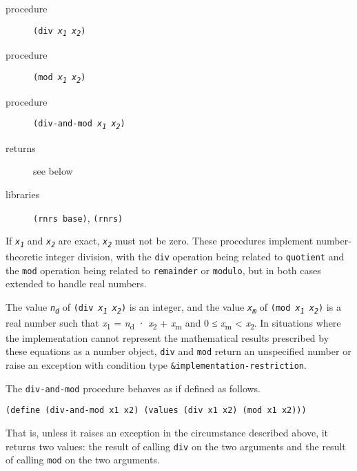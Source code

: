 \begin{description}

\label{objects_s99}\item[procedure] \texttt{(div \textit{x\textsubscript{1}} \textit{x\textsubscript{2}})}



\item[procedure] \texttt{(mod \textit{x\textsubscript{1}} \textit{x\textsubscript{2}})}



\item[procedure] \texttt{(div-and-mod \textit{x\textsubscript{1}} \textit{x\textsubscript{2}})}



\item[returns] see below


\item[libraries] \texttt{(rnrs base)}, \texttt{(rnrs)}
\end{description}


If \texttt{\textit{x\textsubscript{1}}} and \texttt{\textit{x\textsubscript{2}}} are exact, \texttt{\textit{x\textsubscript{2}}} must not be zero.
These procedures implement number-theoretic integer division, with the
\texttt{div} operation being related to \texttt{quotient} and the
\texttt{mod} operation being related to \texttt{remainder} or
\texttt{modulo}, but in both cases extended to handle real numbers.


The value \texttt{\textit{n\textsubscript{d}}} of \texttt{(div \textit{x\textsubscript{1}} \textit{x\textsubscript{2}})} is an integer,
and the value \texttt{\textit{x\textsubscript{m}}} of \texttt{(mod \textit{x\textsubscript{1}} \textit{x\textsubscript{2}})} is a real
number such that \textit{x}\textsubscript{1} = \textit{n}\textsubscript{d} · \textit{x}\textsubscript{2} + \textit{x}\textsubscript{m} and
0 ≤ \textit{x}\textsubscript{m} \textless{} \textbar{}\textit{x}\textsubscript{2}\textbar{}.
In situations where the implementation cannot represent the mathematical
results prescribed by these equations as a number object, \texttt{div} and
\texttt{mod} return an unspecified number or raise an exception with
condition type \texttt{\&{}implementation-restriction}.


The \texttt{div-and-mod} procedure behaves as if defined as follows.


\texttt{(define (div-and-mod x1 x2) (values (div x1 x2) (mod x1 x2)))}

That is, unless it raises an exception in the circumstance described
above, it returns two values: the result of calling \texttt{div} on the
two arguments and the result of calling \texttt{mod} on the two
arguments.


